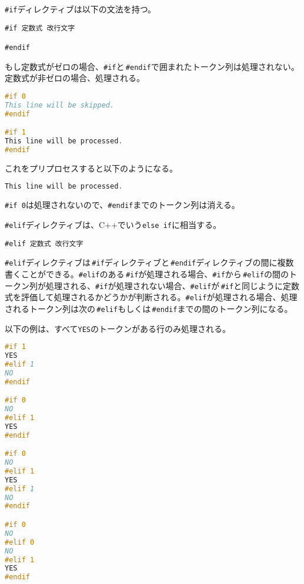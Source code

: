 
\texttt{\#if}ディレクティブは以下の文法を持つ。

\begin{lstlisting}[style=grammar]
#if 定数式 改行文字

#endif
\end{lstlisting}

もし定数式がゼロの場合、\texttt{\#if}と\,\texttt{\#endif}で囲まれたトークン列は処理されない。定数式が非ゼロの場合、処理される。

\begin{lstlisting}[language={C++}]
#if 0
This line will be skipped.
#endif

#if 1
This line will be processed.
#endif
\end{lstlisting}

これをプリプロセスすると以下のようになる。

\begin{lstlisting}[language={C++}]
This line will be processed.
\end{lstlisting}

\texttt{\#if 0}は処理されないので、\texttt{\#endif}までのトークン列は消える。


\texttt{\#elif}ディレクティブは、C++でいう\texttt{else if}に相当する。

\begin{lstlisting}[style=grammar]
#elif 定数式 改行文字
\end{lstlisting}

\texttt{\#elif}ディレクティブは\,\texttt{\#if}ディレクティブと\,\texttt{\#endif}ディレクティブの間に複数書くことができる。\texttt{\#elif}のある\,\texttt{\#if}が処理される場合、\texttt{\#if}から\,\texttt{\#elif}の間のトークン列が処理される、\texttt{\#if}が処理されない場合、\texttt{\#elif}が\,\texttt{\#if}と同じように定数式を評価して処理されるかどうかが判断される。\texttt{\#elif}が処理される場合、処理されるトークン列は次の\,\texttt{\#elif}もしくは\,\texttt{\#endif}までの間のトークン列になる。

以下の例は、すべて\texttt{YES}のトークンがある行のみ処理される。

\begin{lstlisting}[language={C++}]
#if 1
YES
#elif 1
NO
#endif

#if 0
NO
#elif 1
YES
#endif

#if 0
NO
#elif 1
YES
#elif 1
NO
#endif

#if 0
NO
#elif 0
NO
#elif 1
YES
#endif
\end{lstlisting}

